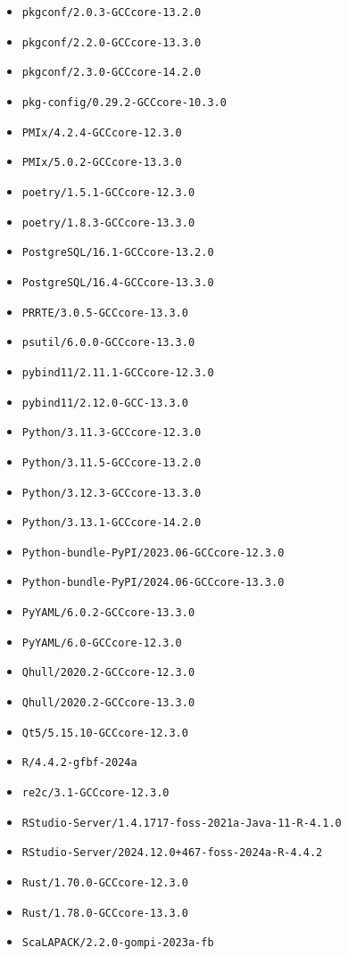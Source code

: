 \begin{multicols}{3}
\begin{itemize}
\item \verb|pkgconf/2.0.3-GCCcore-13.2.0|
\item \verb|pkgconf/2.2.0-GCCcore-13.3.0|
\item \verb|pkgconf/2.3.0-GCCcore-14.2.0|
\item \verb|pkg-config/0.29.2-GCCcore-10.3.0|
\item \verb|PMIx/4.2.4-GCCcore-12.3.0|
\item \verb|PMIx/5.0.2-GCCcore-13.3.0|
\item \verb|poetry/1.5.1-GCCcore-12.3.0|
\item \verb|poetry/1.8.3-GCCcore-13.3.0|
\item \verb|PostgreSQL/16.1-GCCcore-13.2.0|
\item \verb|PostgreSQL/16.4-GCCcore-13.3.0|
\item \verb|PRRTE/3.0.5-GCCcore-13.3.0|
\item \verb|psutil/6.0.0-GCCcore-13.3.0|
\item \verb|pybind11/2.11.1-GCCcore-12.3.0|
\item \verb|pybind11/2.12.0-GCC-13.3.0|
\item \verb|Python/3.11.3-GCCcore-12.3.0|
\item \verb|Python/3.11.5-GCCcore-13.2.0|
\item \verb|Python/3.12.3-GCCcore-13.3.0|
\item \verb|Python/3.13.1-GCCcore-14.2.0|
\item \verb|Python-bundle-PyPI/2023.06-GCCcore-12.3.0|
\item \verb|Python-bundle-PyPI/2024.06-GCCcore-13.3.0|
\item \verb|PyYAML/6.0.2-GCCcore-13.3.0|
\item \verb|PyYAML/6.0-GCCcore-12.3.0|
\item \verb|Qhull/2020.2-GCCcore-12.3.0|
\item \verb|Qhull/2020.2-GCCcore-13.3.0|
\item \verb|Qt5/5.15.10-GCCcore-12.3.0|
\item \verb|R/4.4.2-gfbf-2024a|
\item \verb|re2c/3.1-GCCcore-12.3.0|
\item \verb|RStudio-Server/1.4.1717-foss-2021a-Java-11-R-4.1.0|
\item \verb|RStudio-Server/2024.12.0+467-foss-2024a-R-4.4.2|
\item \verb|Rust/1.70.0-GCCcore-12.3.0|
\item \verb|Rust/1.78.0-GCCcore-13.3.0|
\item \verb|ScaLAPACK/2.2.0-gompi-2023a-fb|

\end{itemize}
\end{multicols}
